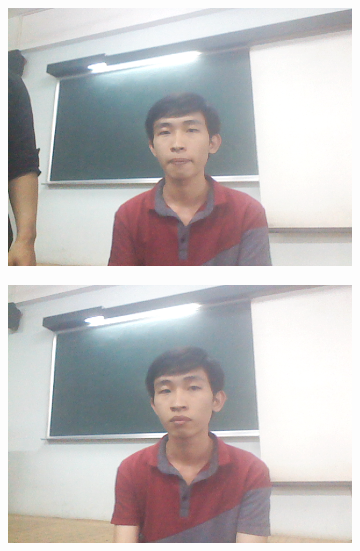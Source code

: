 \documentclass[journal, twocolumn]{IEEEtran}
\begin{document}
\begin{figure}[h!]
  \centering
  \begin{subfigure}[b]{0.35\linewidth}
    \includegraphics[width=\linewidth]{img/1.png}
    \caption{}
  \end{subfigure}
  \begin{subfigure}[b]{0.35\linewidth}
    \includegraphics[width=\linewidth]{img/2.png}
    \caption{}
  \end{subfigure}
  \begin{subfigure}[b]{0.35\linewidth}

\end{subfigure}
\end{figure}
\end{document}
